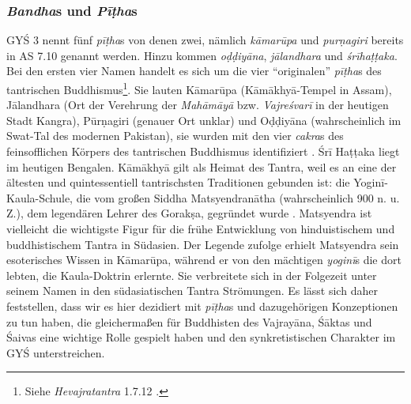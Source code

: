 \documentclass[a4paper,12pt]{article}
\begin{document}
\subsubsection{\textit{Bandha}s und \textit{Pīṭha}s}

GYŚ 3 nennt fünf \textit{pīṭha}s von denen zwei, nämlich \textit{kāmarūpa} und \textit{purṇagiri} bereits in AS 7.10 genannt werden. Hinzu kommen \textit{oḍḍiyāna}, \textit{jālandhara} und \textit{śrīhaṭṭaka}. Bei den ersten vier Namen handelt es sich um die vier ``originalen'' \textit{pīṭha}s des tantrischen Buddhismus\footnote{Siehe \textit{Hevajratantra} 1.7.12 \parencite{hevajra}.}. Sie lauten Kāmarūpa (Kāmākhyā-Tempel in Assam), Jālandhara (Ort der Verehrung der \textit{Mahāmāyā} bzw. \textit{Vajreśvarī} in der heutigen Stadt Kangra), Pūrṇagiri (genauer Ort unklar) und Oḍḍiyāna (wahrscheinlich im Swat-Tal des modernen Pakistan), sie wurden mit den vier \textit{cakra}s des feinsofflichen Körpers des tantrischen Buddhismus identifiziert \parencite[260]{white1996}. Śrī Haṭṭaka liegt im heutigen Bengalen. Kāmākhyā gilt als Heimat des Tantra, weil es an eine der ältesten und quintessentiell tantrischsten Traditionen gebunden ist: die Yoginī-Kaula-Schule, die vom großen Siddha Matsyendranātha (wahrscheinlich 900 n. u. Z.), dem legendären Lehrer des Gorakṣa, gegründet wurde \parencite[39]{urban2010}. Matsyendra ist vielleicht die wichtigste Figur für die frühe Entwicklung von hinduistischem und buddhistischem Tantra in Südasien. Der Legende zufolge erhielt Matsyendra sein esoterisches Wissen in Kāmarūpa, während er von den mächtigen \textit{yoginī}s die dort lebten, die Kaula-Doktrin erlernte. Sie verbreitete sich in der Folgezeit unter seinem Namen in den südasiatischen Tantra Strömungen. Es lässt sich daher feststellen, dass wir es hier dezidiert mit \textit{pīṭha}s und dazugehörigen Konzeptionen zu tun haben, die gleichermaßen für Buddhisten des Vajrayāna, Śāktas und Śaivas eine wichtige Rolle gespielt haben \parencite[31-37]{urban2010} und den synkretistischen Charakter im GYŚ unterstreichen.
\end{document}
